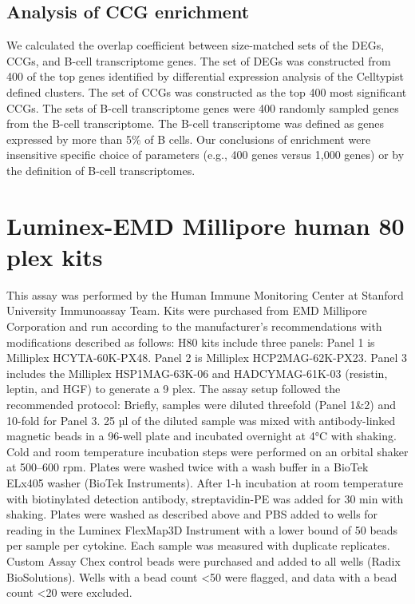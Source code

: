 \subsection{Analysis of CCG enrichment}
We calculated the overlap coefficient between size-matched sets of the DEGs, CCGs, and B-cell transcriptome genes. The set of DEGs was constructed from 400 of the top genes identified by differential expression analysis of the Celltypist defined clusters. The set of CCGs was constructed as the top 400 most significant CCGs. The sets of B-cell transcriptome genes were 400 randomly sampled genes from the B-cell transcriptome. The B-cell transcriptome was defined as genes expressed by more than 5\% of B cells. Our conclusions of enrichment were insensitive specific choice of parameters (e.g., 400 genes versus 1,000 genes) or by the definition of B-cell transcriptomes.

\section{Luminex-EMD Millipore human 80 plex kits}

This assay was performed by the Human Immune Monitoring Center at Stanford University Immunoassay Team. Kits were purchased from EMD Millipore Corporation and run according to the manufacturer’s recommendations with modifications described as follows: H80 kits include three panels: Panel 1 is Milliplex HCYTA-60K-PX48. Panel 2 is Milliplex HCP2MAG-62K-PX23. Panel 3 includes the Milliplex HSP1MAG-63K-06 and HADCYMAG-61K-03 (resistin, leptin, and HGF) to generate a 9 plex. The assay setup followed the recommended protocol: Briefly, samples were diluted threefold (Panel 1\&2) and 10-fold for Panel 3. 25 µl of the diluted sample was mixed with antibody-linked magnetic beads in a 96-well plate and incubated overnight at 4°C with shaking. Cold and room temperature incubation steps were performed on an orbital shaker at 500–600 rpm. Plates were washed twice with a wash buffer in a BioTek ELx405 washer (BioTek Instruments). After 1-h incubation at room temperature with biotinylated detection antibody, streptavidin-PE was added for 30 min with shaking. Plates were washed as described above and PBS added to wells for reading in the Luminex FlexMap3D Instrument with a lower bound of 50 beads per sample per cytokine. Each sample was measured with duplicate replicates. Custom Assay Chex control beads were purchased and added to all wells (Radix BioSolutions). Wells with a bead count <50 were flagged, and data with a bead count <20 were excluded.

